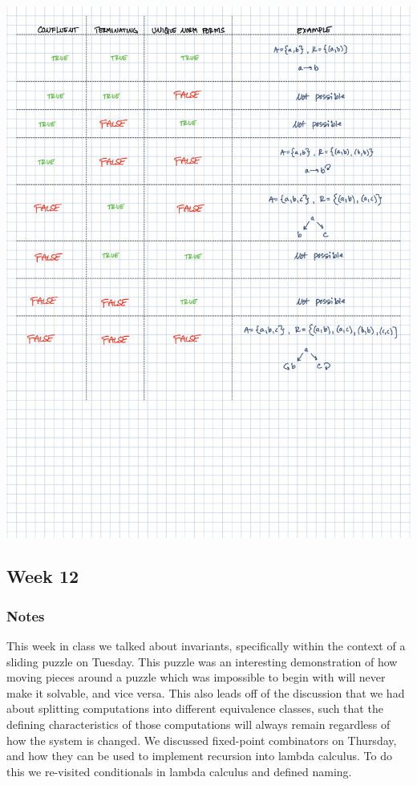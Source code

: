 \documentclass{article}
\theoremstyle{theorem}
\theoremstyle{definition}
\theoremstyle{remark}
\begin{document}
\begin{center}
  \includegraphics[scale=.75]{CPSC354 HW11-2.png}
  \end{center}

\subsection{Week 12}

\subsubsection*{Notes} This week in class we talked about invariants, specifically within the context of a sliding puzzle on Tuesday. This puzzle was an interesting demonstration of how moving pieces around a puzzle which was impossible to begin with will never make it solvable, and vice versa. This also leads off of the discussion that we had about splitting computations into different equivalence classes, such that the defining characteristics of those computations will always remain regardless of how the system is changed. We discussed fixed-point combinators on Thursday, and how they can be used to implement recursion into lambda calculus. To do this we re-visited conditionals in lambda calculus and defined naming.
\end{document}

